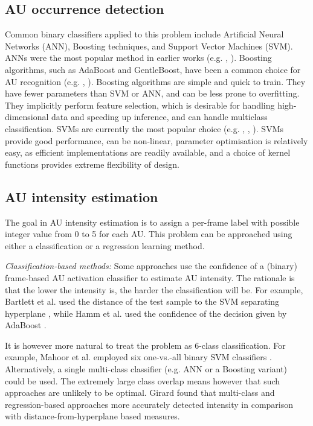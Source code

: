 \documentclass[a4paper, 10pt, conference]{ieeeconf}      \usepackage{FG2017}
\begin{document}
\subsection{AU occurrence detection}
\noindent Common binary classifiers applied to this problem include Artificial Neural Networks (ANN), Boosting techniques, and Support Vector Machines (SVM). ANNs were the most popular method in earlier works (e.g. \cite{TianEtAl02}, \cite{BazzoLamar04}). Boosting algorithms, such as AdaBoost and GentleBoost, have been a common choice for AU recognition (e.g. \cite{HammEtAl11}, \cite{YangEtAl09}). Boosting algorithms are simple and quick to train. They have fewer parameters than SVM or ANN, and can be less prone to overfitting. They implicitly perform feature selection, which is desirable for handling high-dimensional data and speeding up inference, and can handle multiclass classification. SVMs are currently the most popular choice (e.g. \cite{ChewEtAl12}, \cite{WuEtAl12}, \cite{MahoorEtAl09}). SVMs provide good performance, can be non-linear, parameter optimisation is relatively easy, as efficient implementations are readily available, and a choice of kernel functions provides extreme flexibility of design.

\subsection{AU intensity estimation}
\noindent The goal in AU intensity estimation is to assign a per-frame label with possible integer value from 0 to 5 for each AU. This problem can be approached using either a classification or a regression learning method. 

\textit{Classification-based methods:} Some approaches use the confidence of a (binary) frame-based AU activation classifier to estimate  AU intensity. The rationale is that the lower the intensity is, the harder the classification will be. For example, Bartlett et al.  used the distance of the test sample to the SVM separating hyperplane \cite{BartlettEtAl06}, while Hamm et al.  used the confidence of the decision given by AdaBoost \cite{HammEtAl11}. 

It is however more natural to treat the problem as 6-class classification. For example, Mahoor et al.  employed six one-vs.-all binary SVM classifiers \cite{MahoorEtAl09}. Alternatively, a single multi-class classifier (e.g. ANN or a Boosting variant) could be used. The extremely large class overlap means however that such approaches are unlikely to be optimal. Girard \cite{Girard2014} found that multi-class and regression-based approaches more accurately detected intensity in comparison with distance-from-hyperplane based measures. 
\end{document}
